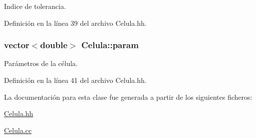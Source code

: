 Indice de tolerancia. 



Definición en la línea 39 del archivo Celula.\+hh.

\subsubsection[{\texorpdfstring{param}{param}}]{\setlength{\rightskip}{0pt plus 5cm}vector$<$double$>$ Celula\+::param\hspace{0.3cm}{\ttfamily [private]}}\hypertarget{class_celula_a386c6da3af12b5662e3866675d60a4b7}{}\label{class_celula_a386c6da3af12b5662e3866675d60a4b7}


Parámetros de la célula. 



Definición en la línea 41 del archivo Celula.\+hh.



La documentación para esta clase fue generada a partir de los siguientes ficheros\+:\begin{DoxyCompactItemize}
\item 
\hyperlink{_celula_8hh}{Celula.\+hh}\item 
\hyperlink{_celula_8cc}{Celula.\+cc}\end{DoxyCompactItemize}
